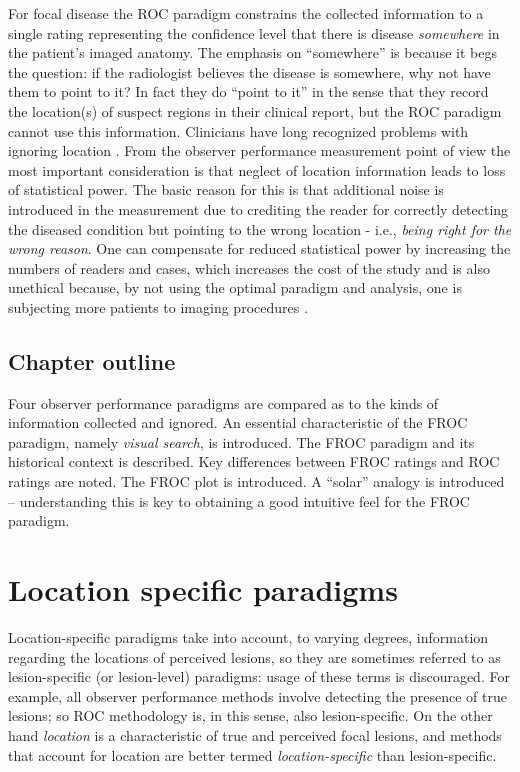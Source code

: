 \documentclass[
]{book}
\begin{document}
For focal disease the ROC paradigm constrains the collected information to a single rating representing the confidence level that there is disease \emph{somewhere} in the patient's imaged anatomy. The emphasis on ``somewhere'' is because it begs the question: if the radiologist believes the disease is somewhere, why not have them to point to it? In fact they do ``point to it'' in the sense that they record the location(s) of suspect regions in their clinical report, but the ROC paradigm cannot use this information. Clinicians have long recognized problems with ignoring location \citep{BlackDwyer1990, RN1921}. From the observer performance measurement point of view the most important consideration is that neglect of location information leads to loss of statistical power. The basic reason for this is that additional noise is introduced in the measurement due to crediting the reader for correctly detecting the diseased condition but pointing to the wrong location - i.e., \emph{being right for the wrong reason}. One can compensate for reduced statistical power by increasing the numbers of readers and cases, which increases the cost of the study and is also unethical because, by not using the optimal paradigm and analysis, one is subjecting more patients to imaging procedures \citep{RN2662}.

\hypertarget{chapter-outline}{%
\subsection{Chapter outline}\label{chapter-outline}}

Four observer performance paradigms are compared as to the kinds of information collected and ignored. An essential characteristic of the FROC paradigm, namely \emph{visual search}, is introduced. The FROC paradigm and its historical context is described. Key differences between FROC ratings and ROC ratings are noted. The FROC plot is introduced. A ``solar'' analogy is introduced -- understanding this is key to obtaining a good intuitive feel for the FROC paradigm.

\hypertarget{location-specific-paradigms}{%
\section{Location specific paradigms}\label{location-specific-paradigms}}

Location-specific paradigms take into account, to varying degrees, information regarding the locations of perceived lesions, so they are sometimes referred to as lesion-specific (or lesion-level) paradigms: usage of these terms is discouraged. For example, all observer performance methods involve detecting the presence of true lesions; so ROC methodology is, in this sense, also lesion-specific. On the other hand \emph{location} is a characteristic of true and perceived focal lesions, and methods that account for location are better termed \emph{location-specific} than lesion-specific.
\end{document}
